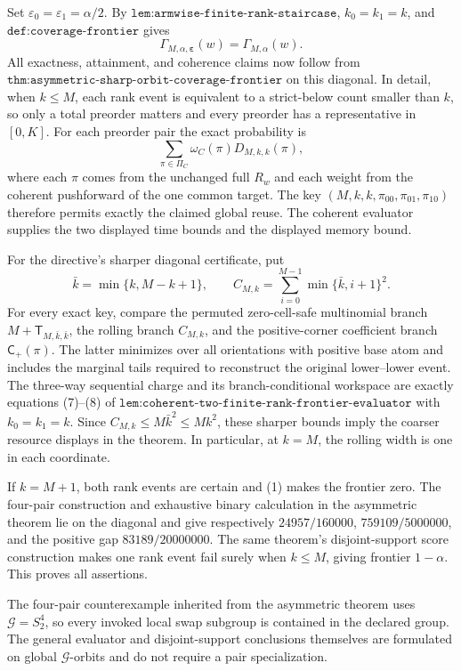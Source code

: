 Set \(\varepsilon_0=\varepsilon_1=\alpha/2\). By \(\texttt{lem:armwise-finite-rank-staircase}\), \(k_0=k_1=k\), and \(\texttt{def:coverage-frontier}\) gives
\[
\Gamma_{M,\alpha,\boldsymbol\varepsilon}(w)=\Gamma_{M,\alpha}(w).
\tag{1}
\]
All exactness, attainment, and coherence claims now follow from \(\texttt{thm:asymmetric-sharp-orbit-coverage-frontier}\) on this diagonal. In detail, when \(k\le M\), each rank event is equivalent to a strict-below count smaller than \(k\), so only a total preorder matters and every preorder has a representative in \([0,K]\). For each preorder pair the exact probability is
\[
\sum_{\pi\in\Pi_C}\omega_C(\pi)D_{M,k,k}(\pi),
\]
where each \(\pi\) comes from the unchanged full \(R_w\) and each weight from the coherent pushforward of the one common target. The key \((M,k,k,\pi_{00},\pi_{01},\pi_{10})\) therefore permits exactly the claimed global reuse. The coherent evaluator supplies the two displayed time bounds and the displayed memory bound.

For the directive's sharper diagonal certificate, put
\[
\bar k=\min\{k,M-k+1\},\qquad C_{M,k}=\sum_{i=0}^{M-1}\min\{\bar k,i+1\}^2.
\]
For every exact key, compare the permuted zero-cell-safe multinomial branch \(M+\mathsf T_{M,\bar k,\bar k}\), the rolling branch \(C_{M,k}\), and the positive-corner coefficient branch \(\mathsf C_+(\pi)\). The latter minimizes over all orientations with positive base atom and includes the marginal tails required to reconstruct the original lower--lower event. The three-way sequential charge and its branch-conditional workspace are exactly equations (7)--(8) of \(\texttt{lem:coherent-two-finite-rank-frontier-evaluator}\) with \(k_0=k_1=k\). Since \(C_{M,k}\le M\bar k^2\le Mk^2\), these sharper bounds imply the coarser resource displays in the theorem. In particular, at \(k=M\), the rolling width is one in each coordinate.

If \(k=M+1\), both rank events are certain and (1) makes the frontier zero. The four-pair construction and exhaustive binary calculation in the asymmetric theorem lie on the diagonal and give respectively \(24957/160000\), \(759109/5000000\), and the positive gap \(83189/20000000\). The same theorem's disjoint-support score construction makes one rank event fail surely when \(k\le M\), giving frontier \(1-\alpha\). This proves all assertions.

The four-pair counterexample inherited from the asymmetric theorem uses \(\mathcal G=S_2^4\), so every invoked local swap subgroup is contained in the declared group. The general evaluator and disjoint-support conclusions themselves are formulated on global \(\mathcal G\)-orbits and do not require a pair specialization.
